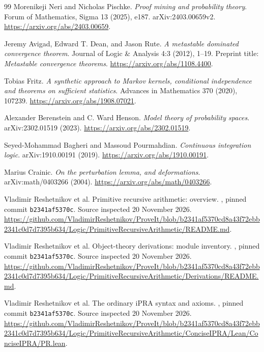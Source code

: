 \begin{thebibliography}{99}
\small
{}
Morenikeji Neri and Nicholas Pischke. \emph{Proof mining and probability theory}. Forum of Mathematics, Sigma 13 (2025), e187. arXiv:2403.00659v2.
\url{https://arxiv.org/abs/2403.00659}.

Jeremy Avigad, Edward T. Dean, and Jason Rute. \emph{A metastable dominated convergence theorem}. Journal of Logic \& Analysis 4:3 (2012), 1--19. Preprint title: \emph{Metastable convergence theorems}.
\url{https://arxiv.org/abs/1108.4400}.

Tobias Fritz. \emph{A synthetic approach to Markov kernels, conditional independence and theorems on sufficient statistics}. Advances in Mathematics 370 (2020), 107239.
\url{https://arxiv.org/abs/1908.07021}.

Alexander Berenstein and C. Ward Henson. \emph{Model theory of probability spaces}. arXiv:2302.01519 (2023).
\url{https://arxiv.org/abs/2302.01519}.

Seyed-Mohammad Bagheri and Massoud Pourmahdian. \emph{Continuous integration logic}. arXiv:1910.00191 (2019).
\url{https://arxiv.org/abs/1910.00191}.

Marius Crainic. \emph{On the perturbation lemma, and deformations}. arXiv:math/0403266 (2004).
\url{https://arxiv.org/abs/math/0403266}.

Vladimir Reshetnikov et al. Primitive recursive arithmetic: overview.
\repo, pinned commit \texttt{b2341af5370c}. Source inspected 20 November 2026.
\url{https://github.com/VladimirReshetnikov/ProveIt/blob/b2341af5370cd8a43f72ebb2341c0d7d7395b634/Logic/PrimitiveRecursiveArithmetic/README.md}.

Vladimir Reshetnikov et al. Object-theory derivations: module inventory.
\repo, pinned commit \texttt{b2341af5370c}. Source inspected 20 November 2026.
\url{https://github.com/VladimirReshetnikov/ProveIt/blob/b2341af5370cd8a43f72ebb2341c0d7d7395b634/Logic/PrimitiveRecursiveArithmetic/Derivations/README.md}.

Vladimir Reshetnikov et al. The ordinary iPRA syntax and axioms.
\repo, pinned commit \texttt{b2341af5370c}. Source inspected 20 November 2026.
\url{https://github.com/VladimirReshetnikov/ProveIt/blob/b2341af5370cd8a43f72ebb2341c0d7d7395b634/Logic/PrimitiveRecursiveArithmetic/ConciseIPRA/Lean/ConciseIPRA/PR.lean}.


\end{thebibliography}
